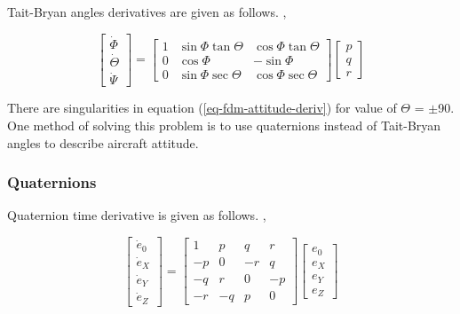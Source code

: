 Tait-Bryan angles derivatives are given as follows. \cite{Sibilski2004}, \cite{Allerton2009}

\begin{equation}
  \label{eq-fdm-attitude-deriv}
  \left[
    \begin{matrix}
      \dot \Phi \\
      \dot \Theta \\
      \dot \Psi
    \end{matrix}
  \right]
  =
  \left[
    \begin{matrix}
      1 & \sin \Phi \tan \Theta & \cos \Phi \tan \Theta \\
      0 & \cos \Phi & -\sin \Phi \\
      0 & \sin \Phi \sec \Theta & \cos \Phi \sec \Theta
    \end{matrix}
  \right]
  \left[
    \begin{matrix}
      p \\
      q \\
      r
    \end{matrix}
  \right]
\end{equation}

There are singularities in equation (\ref{eq-fdm-attitude-deriv}) for value of $\Theta$ = $\pm$90\degree . One method of solving this problem is to use quaternions instead of Tait-Bryan angles to describe aircraft attitude.

\subsubsection{Quaternions}

Quaternion time derivative is given as follows. \cite{Sibilski2004}, \cite{StevensLewis1992}

\begin{equation}
  \label{eq-fdm-quaternion-deriv}
  \left[
    \begin{matrix}
      \dot e_0 \\
      \dot e_X \\
      \dot e_Y \\
      \dot e_Z
    \end{matrix}
  \right]
  =
  \left[
    \begin{matrix}
       1 &  p &  q &  r \\
      -p &  0 & -r &  q \\
      -q &  r &  0 & -p \\
      -r & -q &  p &  0
    \end{matrix}
  \right]
  \left[
    \begin{matrix}
      e_0 \\
      e_X \\
      e_Y \\
      e_Z
    \end{matrix}
  \right]
\end{equation}

